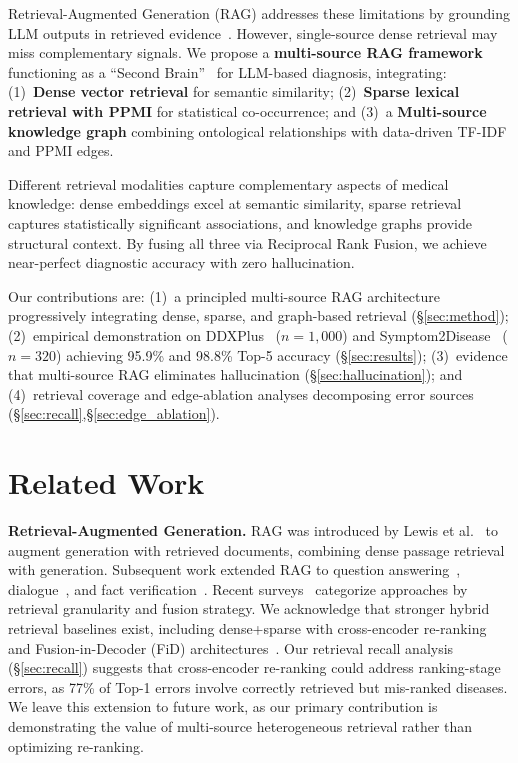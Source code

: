 \documentclass[runningheads]{llncs}
\begin{document}
Retrieval-Augmented Generation (RAG) addresses these limitations by grounding LLM outputs in retrieved evidence~\cite{lewis2020retrieval,gao2023retrieval}. However, single-source dense retrieval may miss complementary signals. We propose a \textbf{multi-source RAG framework} functioning as a ``Second Brain''~\cite{forte2022building} for LLM-based diagnosis, integrating: (1)~\textbf{Dense vector retrieval} for semantic similarity; (2)~\textbf{Sparse lexical retrieval with PPMI} for statistical co-occurrence; and (3)~a \textbf{Multi-source knowledge graph} combining ontological relationships with data-driven TF-IDF and PPMI edges.

Different retrieval modalities capture complementary aspects of medical knowledge: dense embeddings excel at semantic similarity, sparse retrieval captures statistically significant associations, and knowledge graphs provide structural context. By fusing all three via Reciprocal Rank Fusion, we achieve near-perfect diagnostic accuracy with zero hallucination.

Our contributions are: (1)~a principled multi-source RAG architecture progressively integrating dense, sparse, and graph-based retrieval (\S\ref{sec:method}); (2)~empirical demonstration on DDXPlus~\cite{fansi2022ddxplus} ($n{=}1{,}000$) and Symptom2Disease~\cite{gretelai_s2d} ($n{=}320$) achieving 95.9\% and 98.8\% Top-5 accuracy (\S\ref{sec:results}); (3)~evidence that multi-source RAG eliminates hallucination (\S\ref{sec:hallucination}); and (4)~retrieval coverage and edge-ablation analyses decomposing error sources (\S\ref{sec:recall},\S\ref{sec:edge_ablation}).

\section{Related Work}
\label{sec:related}

\textbf{Retrieval-Augmented Generation.} RAG was introduced by Lewis et al.~\cite{lewis2020retrieval} to augment generation with retrieved documents, combining dense passage retrieval~\cite{karpukhin2020dense} with generation. Subsequent work extended RAG to question answering~\cite{izacard2021leveraging}, dialogue~\cite{shuster2021retrieval}, and fact verification~\cite{thorne2018fever}. Recent surveys~\cite{gao2023retrieval,zhao2024retrieval} categorize approaches by retrieval granularity and fusion strategy. We acknowledge that stronger hybrid retrieval baselines exist, including dense+sparse with cross-encoder re-ranking~\cite{nogueira2020passage} and Fusion-in-Decoder (FiD) architectures~\cite{izacard2021leveraging}. Our retrieval recall analysis (\S\ref{sec:recall}) suggests that cross-encoder re-ranking could address ranking-stage errors, as 77\% of Top-1 errors involve correctly retrieved but mis-ranked diseases. We leave this extension to future work, as our primary contribution is demonstrating the value of multi-source heterogeneous retrieval rather than optimizing re-ranking.
\end{document}
